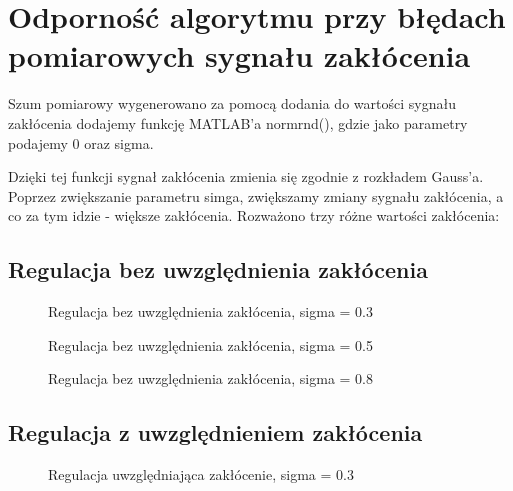\section{Odporność algorytmu przy błędach pomiarowych sygnału zakłócenia}
\label{projekt:zad7}

Szum pomiarowy wygenerowano za pomocą dodania do wartości sygnału zakłócenia
dodajemy funkcję MATLAB’a normrnd(), 
gdzie jako parametry podajemy 0 oraz sigma.

Dzięki tej funkcji sygnał zakłócenia zmienia się zgodnie z rozkładem Gauss’a.
Poprzez zwiększanie parametru simga, zwiększamy zmiany sygnału zakłócenia, 
a co za tym idzie - większe zakłócenia. 
Rozważono trzy różne wartości zakłócenia:


\subsection{Regulacja bez uwzględnienia zakłócenia}
\label{projekt:zad7:regulacjaBezUwzg}

\begin{figure}[H] 
    \centering
    
    \caption{Regulacja bez uwzględnienia zakłócenia, sigma = \num{0.3}}
    \label{projekt:zad7:regulacjaBezUwzg:figureSigma0_3}
\end{figure}

\begin{figure}[H] 
    \centering
    
    \caption{Regulacja bez uwzględnienia zakłócenia, sigma = \num{0.5}}
    \label{projekt:zad7:regulacjaBezUwzg:figureSigma0_5}
\end{figure}

\begin{figure}[H] 
    \centering
    
    \caption{Regulacja bez uwzględnienia zakłócenia, sigma = \num{0.8}}
    \label{projekt:zad7:regulacjaBezUwzg:figureSigma0_8}
\end{figure}

\subsection{Regulacja z uwzględnieniem zakłócenia}
\label{projekt:zad7:regulacjaZUwzg}

\begin{figure}[H] 
    \centering
    
    \caption{Regulacja uwzględniająca zakłócenie, sigma = \num{0.3}}
    \label{projekt:zad7:regulacjaZUwzg:figureSigma0_3}
\end{figure}

